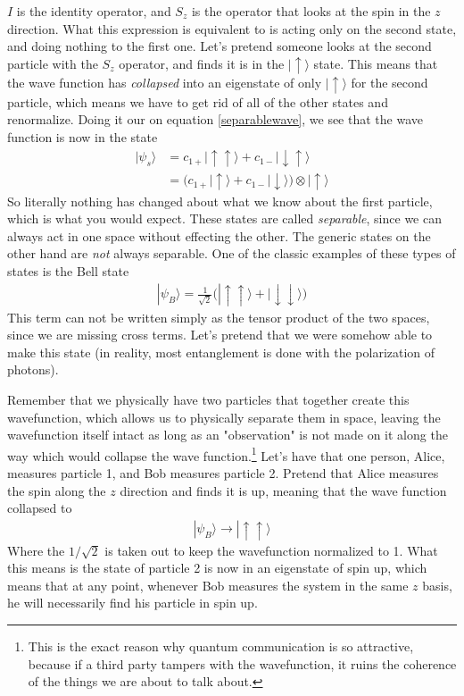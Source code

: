 $I$ is the identity operator, and $S_z$ is the operator that looks at the spin in the $z$ direction. What this expression is equivalent to is acting only on the second state, and doing nothing to the first one. Let's pretend someone looks at the second particle with the $S_z$ operator, and finds it is in the $|\uparrow\rangle$ state. This means that the wave function has \emph{collapsed} into an eigenstate of only  $|\uparrow\rangle$ for the second particle, which means we have to get rid of all of the other states and renormalize. Doing it our on equation \ref{separablewave}, we see that the wave function is now in the state
\begin{align}
    |\psi_s\rangle &= c_{1+}|\uparrow\uparrow\rangle + c_{1-}|\downarrow\uparrow\rangle \\
    &= \Big(c_{1+}|\uparrow\rangle + c_{1-}|\downarrow\rangle\Big)\otimes |\uparrow\rangle
\end{align}
So literally nothing has changed about what we know about the first particle, which is what you would expect. These states are called \emph{separable}, since we can always act in one space without effecting the other. The generic states on the other hand are \emph{not} always separable. One of the classic examples of these types of states is the Bell state
\begin{align}
    |\psi_B\rangle = \frac{1}{\sqrt{2}} \Big(|\uparrow\uparrow \rangle + |\downarrow\downarrow\rangle\Big)
\end{align}
This term can not be written simply as the tensor product of the two spaces, since we are missing cross terms. Let's pretend that we were somehow able to make this state (in reality, most entanglement is done with the polarization of photons). 

Remember that we physically have two particles that together create this wavefunction, which allows us to physically separate them in space, leaving the wavefunction itself intact as long as an "observation" is not made on it along the way which would collapse the wave function.\footnote{This is the exact reason why quantum communication is so attractive, because if a third party tampers with the wavefunction, it ruins the coherence of the things we are about to talk about.} Let's have that one person, Alice, measures particle 1, and Bob measures particle 2. Pretend that Alice measures the spin along the $z$ direction and finds it is up, meaning that the wave function collapsed to
\begin{align}
    |\psi_B\rangle \rightarrow |\uparrow\uparrow\rangle
\end{align}
Where the $1/\sqrt{2}$ is taken out to keep the wavefunction normalized to 1. What this means is the state of particle 2 is now in an eigenstate of spin up, which means that at any point, whenever Bob measures the system in the same $z$ basis, he will necessarily find his particle in spin up. 

